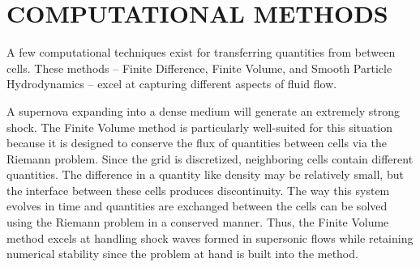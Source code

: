 \section{\MakeUppercase{Computational Methods}} 
\label{sec:Deepdiffusion}



A few computational techniques exist for transferring quantities from between cells.
These methods -- Finite Difference, Finite Volume, and Smooth Particle Hydrodynamics -- excel at capturing different aspects of fluid flow.

A supernova expanding into a dense medium will generate an extremely strong shock.
The Finite Volume method is particularly well-suited for this situation because it is designed to conserve the flux of quantities between cells via the Riemann problem.
Since the grid is discretized, neighboring cells contain different quantities. The difference in a quantity like density may be relatively small, but the interface between these cells produces discontinuity.
The way this system evolves in time and quantities are exchanged between the cells can be solved using the Riemann problem in a conserved manner.
Thus, the Finite Volume method excels at handling shock waves formed in supersonic flows while retaining numerical stability since the problem at hand is built into the method.
